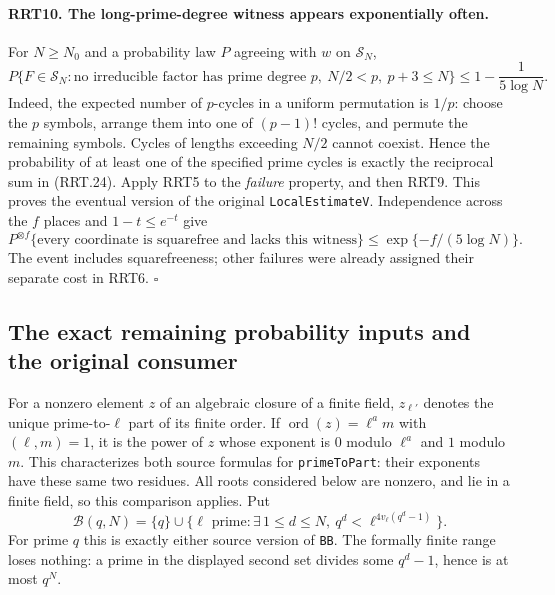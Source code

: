 \paragraph{RRT10. The long-prime-degree witness appears exponentially often.}
\label{claim:RRT10}
For $N\ge N_0$ and a probability law $P$ agreeing with $w$ on
$\mathcal S_N$,
\[
 P\{F\in\mathcal S_N:\text{no irreducible factor has prime degree }p,
                         \ N/2<p,\ p+3\le N\}
                   \le1-\frac1{5\log N}.
 \tag{RRT.27}
\]
Indeed, the expected number of $p$-cycles in a uniform
permutation is $1/p$: choose the $p$ symbols, arrange them into
one of $(p-1)!$ cycles, and permute the remaining symbols.
Cycles of lengths exceeding $N/2$ cannot coexist.  Hence the
probability of at least one of the specified prime cycles is
exactly the reciprocal sum in (RRT.24).  Apply RRT5 to the
\emph{failure} property, and then RRT9.  This proves the
eventual version of the original \texttt{LocalEstimateV}.
Independence across the $f$ places and $1-t\le e^{-t}$ give
\[
 P^{\otimes f}\{\text{every coordinate is squarefree and lacks
                          this witness}\}
                       \le\exp\{-f/(5\log N)\}.
 \tag{RRT.28}
\]
The event includes squarefreeness; other failures were already
assigned their separate cost in RRT6.
\hfill$\square$

\subsection{The exact remaining probability inputs and the original consumer}

For a nonzero element $z$ of an algebraic closure of a finite
field, $z_{\ell'}$ denotes the unique prime-to-$\ell$ part of
its finite order.  If $\operatorname{ord}(z)=\ell^a m$ with
$(\ell,m)=1$, it is the power of $z$ whose exponent is $0$
modulo $\ell^a$ and $1$ modulo $m$.  This characterizes both
source formulas for \texttt{primeToPart}: their exponents have
these same two residues.  All roots considered below are
nonzero, and lie in a finite field, so this comparison applies.
Put
\[
 \mathcal B(q,N)=\{q\}\cup
 \{\ell\text{ prime}:\exists\,1\le d\le N,
                           \ q^d<\ell^{4v_\ell(q^d-1)}\}.
 \tag{RRT.29}
\]
For prime $q$ this is exactly either source version of
\texttt{BB}.  The formally finite range loses nothing: a prime
in the displayed second set divides some $q^d-1$, hence is at
most $q^N$.

